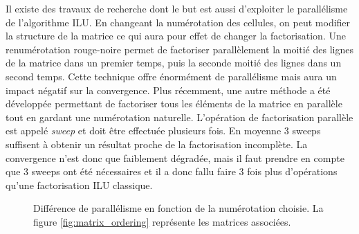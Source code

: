 Il existe des travaux de recherche dont le but est aussi d'exploiter le parallélisme de l'algorithme ILU.
%
En changeant la numérotation des cellules, on peut modifier la structure de la matrice ce qui aura pour effet de changer la factorisation.
%
Une renumérotation rouge-noire permet de factoriser parallèlement la moitié des lignes de la matrice dans un premier temps, puis la seconde moitié des lignes dans un second temps.
%
Cette technique offre énormément de parallélisme mais aura un impact négatif sur la convergence\cite{red_black_ilu}.
%
Plus récemment, une autre méthode a été développée permettant de factoriser tous les éléments de la matrice en parallèle tout en gardant une numérotation naturelle.
%
L'opération de factorisation parallèle est appelé {\em sweep} et doit être effectuée plusieurs fois\cite{chow2014fine}.
%
En moyenne 3 sweeps suffisent à obtenir un résultat proche de la factorisation incomplète.
%
La convergence n'est donc que faiblement dégradée, mais il faut prendre en compte que 3 sweeps ont été nécessaires et il a donc fallu faire 3 fois plus d'opérations qu'une factorisation ILU classique.

\begin{figure}[!h]
     \begin{center}
    \end{center}
    \caption{Différence de parallélisme en fonction de la numérotation choisie. La figure \ref{fig:matrix_ordering} représente les matrices associées.}
    \label{fig:DAG_ordering}
\end{figure}
